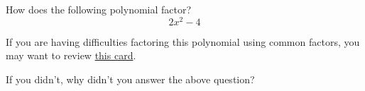 \documentclass{ximera}
\begin{document}
\begin{problem} 
\begin{problem}
    How does the following polynomial factor?
    $$2x^2 - 4$$
    
    \begin{hint}
    If you are having difficulties factoring this polynomial using common factors, you may want to review \href{https://ximera.osu.edu/math160fa17/m160prerequisites/prerequisiteVideos/fundamentalsOfFactoring}{this card}.
    \end{hint}
    
  \begin{multipleChoice}
      

  \end{multipleChoice}
  
\end{problem}
\begin{question}

    If you didn't, why didn't you answer the above question?

  \begin{multipleChoice}
      

     
  \end{multipleChoice}
\end{question}
\end{problem}
\end{document}
